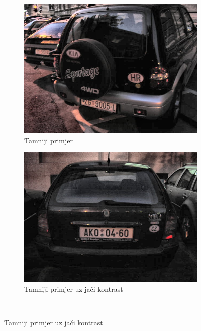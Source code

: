 \documentclass[times, utf8, diplomski]{fer}
\begin{document}
\begin{figure}[H]
     \centering
     \begin{subfigure}[b]{0.4\textwidth}
         \centering
         \includegraphics[width=\textwidth]{figures/ce_examples/1/clahe.jpg}
         \caption{Tamniji primjer}
     \end{subfigure}
     \hspace{1cm}
     \begin{subfigure}[b]{0.4\textwidth}
         \centering
         \includegraphics[width=\textwidth]{figures/ce_examples/2/clahe.jpg}
         \caption{Tamniji primjer uz jači kontrast}
     \end{subfigure}\\[0.5cm]

\end{figure}
\end{document}
